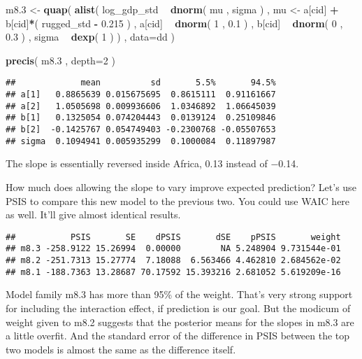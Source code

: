 \documentclass[
]{article}
\newenvironment{Shaded}{\begin{snugshade}}{\end{snugshade}}
\newcommand{\DataTypeTok}[1]{\textcolor[rgb]{0.13,0.29,0.53}{#1}}
\newcommand{\DecValTok}[1]{\textcolor[rgb]{0.00,0.00,0.81}{#1}}
\newcommand{\FloatTok}[1]{\textcolor[rgb]{0.00,0.00,0.81}{#1}}
\newcommand{\KeywordTok}[1]{\textcolor[rgb]{0.13,0.29,0.53}{\textbf{#1}}}
\newcommand{\NormalTok}[1]{#1}
\newcommand{\OperatorTok}[1]{\textcolor[rgb]{0.81,0.36,0.00}{\textbf{#1}}}
\newcommand{\StringTok}[1]{\textcolor[rgb]{0.31,0.60,0.02}{#1}}
\begin{document}
\begin{Shaded}
\begin{Highlighting}[]
\NormalTok{m8}\FloatTok{.3}\NormalTok{ <-}\StringTok{ }\KeywordTok{quap}\NormalTok{(}
    \KeywordTok{alist}\NormalTok{(}
\NormalTok{        log_gdp_std }\OperatorTok{~}\StringTok{ }\KeywordTok{dnorm}\NormalTok{( mu , sigma ) ,}
\NormalTok{        mu <-}\StringTok{ }\NormalTok{a[cid] }\OperatorTok{+}\StringTok{ }\NormalTok{b[cid]}\OperatorTok{*}\NormalTok{( rugged_std }\OperatorTok{-}\StringTok{ }\FloatTok{0.215}\NormalTok{ ) ,}
\NormalTok{        a[cid] }\OperatorTok{~}\StringTok{ }\KeywordTok{dnorm}\NormalTok{( }\DecValTok{1}\NormalTok{ , }\FloatTok{0.1}\NormalTok{ ) ,}
\NormalTok{        b[cid] }\OperatorTok{~}\StringTok{ }\KeywordTok{dnorm}\NormalTok{( }\DecValTok{0}\NormalTok{ , }\FloatTok{0.3}\NormalTok{ ) ,}
\NormalTok{        sigma }\OperatorTok{~}\StringTok{ }\KeywordTok{dexp}\NormalTok{( }\DecValTok{1}\NormalTok{ )}
\NormalTok{) , }\DataTypeTok{data=}\NormalTok{dd )}

\KeywordTok{precis}\NormalTok{( m8}\FloatTok{.3}\NormalTok{ , }\DataTypeTok{depth=}\DecValTok{2}\NormalTok{ )}
\end{Highlighting}
\end{Shaded}

\begin{verbatim}
##             mean          sd       5.5%       94.5%
## a[1]   0.8865639 0.015675695  0.8615111  0.91161667
## a[2]   1.0505698 0.009936606  1.0346892  1.06645039
## b[1]   0.1325054 0.074204443  0.0139124  0.25109846
## b[2]  -0.1425767 0.054749403 -0.2300768 -0.05507653
## sigma  0.1094941 0.005935299  0.1000084  0.11897987
\end{verbatim}

The slope is essentially reversed inside Africa, 0.13 instead of −0.14.

How much does allowing the slope to vary improve expected prediction?
Let's use PSIS to compare this new model to the previous two. You could
use WAIC here as well. It'll give almost identical results.

\begin{verbatim}
##           PSIS       SE    dPSIS       dSE    pPSIS       weight
## m8.3 -258.9122 15.26994  0.00000        NA 5.248904 9.731544e-01
## m8.2 -251.7313 15.27774  7.18088  6.563466 4.462810 2.684562e-02
## m8.1 -188.7363 13.28687 70.17592 15.393216 2.681052 5.619209e-16
\end{verbatim}

Model family m8.3 has more than 95\% of the weight. That's very strong
support for including the interaction effect, if prediction is our goal.
But the modicum of weight given to m8.2 suggests that the posterior
means for the slopes in m8.3 are a little overfit. And the standard
error of the difference in PSIS between the top two models is almost the
same as the difference itself.
\end{document}
